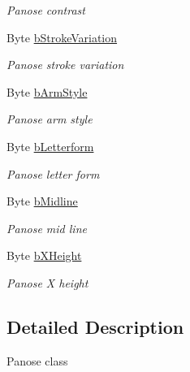 \begin{DoxyCompactItemize}
\begin{DoxyCompactList}\small\item\em Panose contrast \end{DoxyCompactList}\item 
Byte \hyperlink{class_pdf_file_writer_1_1_win_panose_ad96cc96941ffd36487aa9ed39c85e5c9}{b\+Stroke\+Variation}
\begin{DoxyCompactList}\small\item\em Panose stroke variation \end{DoxyCompactList}\item 
Byte \hyperlink{class_pdf_file_writer_1_1_win_panose_a0da5d725fb1445c1fd8b526e980a3e79}{b\+Arm\+Style}
\begin{DoxyCompactList}\small\item\em Panose arm style \end{DoxyCompactList}\item 
Byte \hyperlink{class_pdf_file_writer_1_1_win_panose_a7276b354af20a5744351b1dc4c2141ec}{b\+Letterform}
\begin{DoxyCompactList}\small\item\em Panose letter form \end{DoxyCompactList}\item 
Byte \hyperlink{class_pdf_file_writer_1_1_win_panose_a9f167b8d35c2cd0992a6a0ce2e57d1df}{b\+Midline}
\begin{DoxyCompactList}\small\item\em Panose mid line \end{DoxyCompactList}\item 
Byte \hyperlink{class_pdf_file_writer_1_1_win_panose_aa066bd57eb9e751aaef1672f57322cfc}{b\+X\+Height}
\begin{DoxyCompactList}\small\item\em Panose X height \end{DoxyCompactList}\end{DoxyCompactItemize}


\subsection{Detailed Description}
Panose class 


